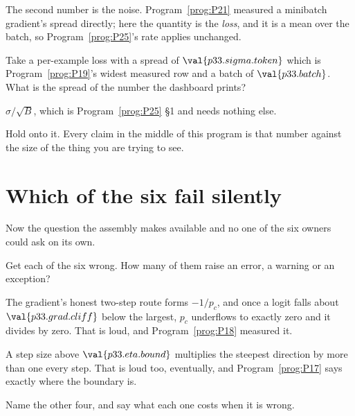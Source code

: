 \begin{fr}
The second number is the noise. Program~\ref{prog:P21} measured a minibatch
gradient's spread directly; here the quantity is the \emph{loss}, and it is a
mean over the batch, so Program~\ref{prog:P25}'s rate applies unchanged.

Take a per-example loss with a spread of $\val{p33.sigma.token}$ \dash{}
which is Program~\ref{prog:P19}'s widest measured row \dash{} and a batch of
$\val{p33.batch}$. What is the spread of the number the dashboard prints?
\dotline
\nextframe
\end{fr}

\begin{fr}
$\sigma/\sqrt{B}$, which is Program~\ref{prog:P25} §1 and needs nothing else.

Hold onto it. Every claim in the middle of this program is that number
against the size of the thing you are trying to see.
\end{fr}

\section{Which of the six fail silently}
\label{sec:P33-silent}

\begin{fr}
Now the question the assembly makes available and no one of the six owners
could ask on its own.

Get each of the six wrong. How many of them raise an error, a warning or an
exception?
\dotline
\nextframe
\end{fr}

\begin{fr}
\begin{ansblock}
The gradient's honest two-step route forms $-1/p_c$, and once a logit falls
about $\val{p33.grad.cliff}$ below the largest, $p_c$ underflows to exactly
zero and it divides by zero. That is loud, and Program~\ref{prog:P18}
measured it.

A step size above $\val{p33.eta.bound}$ multiplies the steepest direction by
more than one every step. That is loud too, eventually, and
Program~\ref{prog:P17} says exactly where the boundary is.
\end{ansblock}

Name the other four, and say what each one costs when it is wrong.
\dotline
\nextframe
\end{fr}

